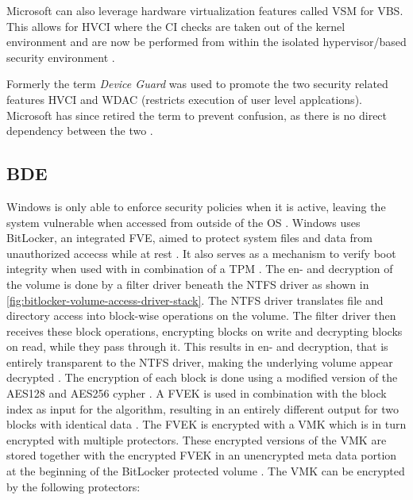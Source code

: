 Microsoft can also leverage hardware virtualization features called \ac{VSM} for \ac{VBS}.
This allows for \ac{HVCI} where the \ac{CI} checks are taken out of the kernel environment and are now be performed from within the isolated hypervisor\-/based security environment \cite{micosoft-windows-oem-vbs}.

Formerly the term \emph{Device Guard} was used to promote the two security related features \ac{HVCI} and \ac{WDAC} (restricts execution of user level applcations).
Microsoft has since retired the term to prevent confusion, as there is no direct dependency between the two \cite{microsoft-windows-no-longer-device-guard}.

\subsection{\acf{BDE}}
\label{sec:windows:security:bde}

Windows is only able to enforce security policies when it is active, leaving the system vulnerable when accessed from outside of the \ac{OS} \cite[Section 9]{windows-internals-6-part2}.
Windows uses BitLocker, an integrated \ac{FVE}, aimed to protect system files and data from unauthorized accecss while at rest \cite{microsoft-bitlocker-overview}.
It also serves as a mechanism to verify boot integrity when used with in combination of a \ac{TPM} \cite[Section 9]{windows-internals-6-part2}.
The en- and decryption of the volume is done by a filter driver beneath the \ac{NTFS} driver as shown in \autoref{fig:bitlocker-volume-access-driver-stack}.
The \ac{NTFS} driver translates file and directory access into block-wise operations on the volume.
The filter driver then receives these block operations, encrypting blocks on write and decrypting blocks on read, while they pass through it.
This results in en- and decryption, that is entirely transparent to the \ac{NTFS} driver, making the underlying volume appear decrypted \cite[Section 9]{windows-internals-6-part2}.
The encryption of each block is done using a modified version of the \ac{AES}128 and \ac{AES}256 cypher \cite[Section 9]{windows-internals-6-part2}.
A \ac{FVEK} is used in combination with the block index as input for the algorithm, resulting in an entirely different output for two blocks with identical data \cite[Section 9]{windows-internals-6-part2}.
The \ac{FVEK} is encrypted with a \ac{VMK} which is in turn encrypted with multiple protectors.
These encrypted versions of the \ac{VMK} are stored together with the encrypted \ac{FVEK} in an unencrypted meta data portion at the beginning of the BitLocker protected volume \cite[Section 9]{windows-internals-6-part2}.
The \ac{VMK} can be encrypted by the following protectors:

